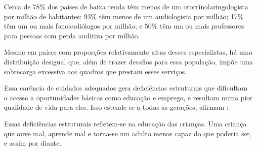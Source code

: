 \begin{citacao}
    Cerca de 78\% dos países de baixa renda têm menos de um otorrinolaringologista por milhão de habitantes; 93\% têm menos de um audiologista por milhão; 17\% têm um ou mais fonoaudiólogos por milhão; e 50\% têm um ou mais professores para pessoas com perda auditiva por milhão.

    Mesmo em países com proporções relativamente altas desses especialistas, há uma distribuição desigual que, além de trazer desafios para essa população, impõe uma sobrecarga excessiva aos quadros que prestam esses serviços.~\cite{opas-2021-oms-estima}
\end{citacao}


Essa carência de cuidados adequados gera deficiências estruturais que dificultam o acesso a oportunidades básicas como educação e emprego, e resultam numa pior qualidade de vida para eles.
Isso estende-se a todas as gerações, afirmam :

\begin{citacao}
    Essas deficiências estruturais refletem-se na educação das crianças. Uma criança que ouve mal, aprende mal e torna-se um adulto menos capaz do que poderia ser, e assim por diante.~\cite{ebc-2021-oms-estima}
\end{citacao}


